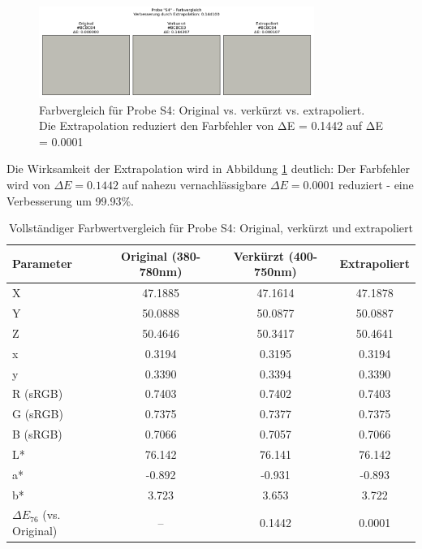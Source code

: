 \begin{figure}[htbp]
    \centering
    \includegraphics[width=0.8\textwidth]{./figures/S4_extrapolation_farben.png}
    \caption{Farbvergleich für Probe S4: Original vs. verkürzt vs. extrapoliert. Die Extrapolation reduziert den Farbfehler von ΔE = 0.1442 auf ΔE = 0.0001}
    \label{fig:s4_color_extrapolation}
\end{figure}

Die Wirksamkeit der Extrapolation wird in Abbildung \ref{fig:s4_color_extrapolation} deutlich: Der Farbfehler wird von $\Delta E = 0.1442$ auf nahezu vernachlässigbare $\Delta E = 0.0001$ reduziert - eine Verbesserung um 99.93\%.

\begin{table}[htbp]
\centering
\caption{Vollständiger Farbwertvergleich für Probe S4: Original, verkürzt und extrapoliert}
\begin{tabular}{lccc}
\hline
\textbf{Parameter} & \textbf{Original (380-780nm)} & \textbf{Verkürzt (400-750nm)} & \textbf{Extrapoliert} \\
\hline
X & 47.1885 & 47.1614 & 47.1878 \\
Y & 50.0888 & 50.0877 & 50.0887 \\
Z & 50.4646 & 50.3417 & 50.4641 \\
x & 0.3194 & 0.3195 & 0.3194 \\
y & 0.3390 & 0.3394 & 0.3390 \\
R (sRGB) & 0.7403 & 0.7402 & 0.7403 \\
G (sRGB) & 0.7375 & 0.7377 & 0.7375 \\
B (sRGB) & 0.7066 & 0.7057 & 0.7066 \\
L* & 76.142 & 76.141 & 76.142 \\
a* & -0.892 & -0.931 & -0.893 \\
b* & 3.723 & 3.653 & 3.722 \\
\hline
$\Delta E_{76}$ (vs. Original) & -- & 0.1442 & 0.0001 \\
\hline
\end{tabular}
\label{tab:s4_extrapolation_comparison}
\end{table}

